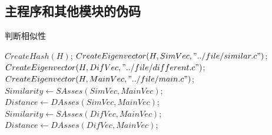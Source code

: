 \subsection{主程序和其他模块的伪码}\label{subsec:code2}
\begin{algorithm}[H]
	\caption{判断相似性}
	\begin{algorithmic}[1] %
			\State $CreateHash(H)$;
			\State $CreateEigenvector(H, SimVec, "../file/similar.c")$;
			\State $CreateEigenvector(H, DifVec, "../file/different.c")$;
			\State $CreateEigenvector(H, MainVec, "../file/main.c")$;
			\State $Similarity \gets SAsses(SimVec, MainVec)$;
			\State $Distance \gets DAsses(SimVec, MainVec)$;
			\State $Similarity \gets SAsses(DifVec, MainVec)$;
			\State $Distance \gets DAsses(DifVec, MainVec)$;
		\EndFunction
	\end{algorithmic}\label{alg:algorithm6}
\end{algorithm}

